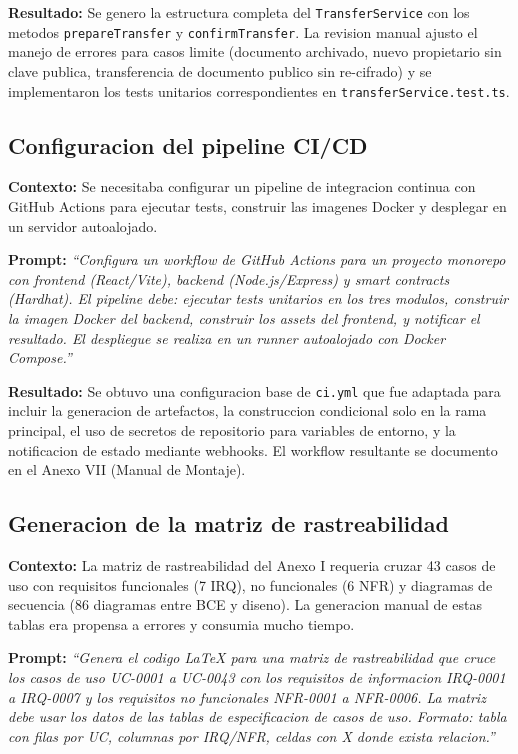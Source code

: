 \documentclass[11pt, a4paper]{article}
\begin{document}
\textbf{Resultado:} Se genero la estructura completa del \texttt{TransferService} con los metodos \texttt{prepareTransfer} y \texttt{confirmTransfer}. La revision manual ajusto el manejo de errores para casos limite (documento archivado, nuevo propietario sin clave publica, transferencia de documento publico sin re-cifrado) y se implementaron los tests unitarios correspondientes en \texttt{transferService.test.ts}.

\subsection{Configuracion del pipeline CI/CD}

\textbf{Contexto:} Se necesitaba configurar un pipeline de integracion continua con GitHub Actions para ejecutar tests, construir las imagenes Docker y desplegar en un servidor autoalojado.

\textbf{Prompt:} \textit{``Configura un workflow de GitHub Actions para un proyecto monorepo con frontend (React/Vite), backend (Node.js/Express) y smart contracts (Hardhat). El pipeline debe: ejecutar tests unitarios en los tres modulos, construir la imagen Docker del backend, construir los assets del frontend, y notificar el resultado. El despliegue se realiza en un runner autoalojado con Docker Compose.''}

\textbf{Resultado:} Se obtuvo una configuracion base de \texttt{ci.yml} que fue adaptada para incluir la generacion de artefactos, la construccion condicional solo en la rama principal, el uso de secretos de repositorio para variables de entorno, y la notificacion de estado mediante webhooks. El workflow resultante se documento en el Anexo VII (Manual de Montaje).

\subsection{Generacion de la matriz de rastreabilidad}

\textbf{Contexto:} La matriz de rastreabilidad del Anexo I requeria cruzar 43 casos de uso con requisitos funcionales (7 IRQ), no funcionales (6 NFR) y diagramas de secuencia (86 diagramas entre BCE y diseno). La generacion manual de estas tablas era propensa a errores y consumia mucho tiempo.

\textbf{Prompt:} \textit{``Genera el codigo LaTeX para una matriz de rastreabilidad que cruce los casos de uso UC-0001 a UC-0043 con los requisitos de informacion IRQ-0001 a IRQ-0007 y los requisitos no funcionales NFR-0001 a NFR-0006. La matriz debe usar los datos de las tablas de especificacion de casos de uso. Formato: tabla con filas por UC, columnas por IRQ/NFR, celdas con X donde exista relacion.''}
\end{document}
